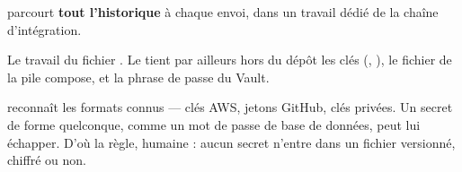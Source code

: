 \parade
{} parcourt \textbf{tout l'historique} à chaque envoi, dans un
travail dédié de la chaîne d'intégration.

\danslecode
Le travail  du fichier . Le
 tient par ailleurs hors du dépôt les clés
(, ), le fichier  de la pile
compose, et la phrase de passe du Vault.

\limite
{} reconnaît les formats connus --- clés AWS, jetons GitHub,
clés privées. Un secret de forme quelconque, comme un mot de passe de base de
données, peut lui échapper. D'où la règle, humaine : aucun secret n'entre dans
un fichier versionné, chiffré ou non.
